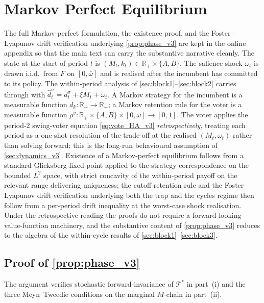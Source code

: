 \documentclass[11pt,twoside]{extarticle}
\begin{document}
\section{Markov Perfect Equilibrium} \label{oa:mpe_v3}

The full Markov-perfect formulation, the existence proof, and the Foster--Lyapunov drift verification underlying \autoref{prop:phase_v3} are kept in the online appendix so that the main text can carry the substantive narrative cleanly. The state at the start of period $t$ is $(M_t,k_t)\in\mathbb R_+\times\{A,B\}$. The salience shock $\omega_t$ is drawn i.i.d.\ from $F$ on $[0,\bar\omega]$ and is realised after the incumbent has committed to its policy. The within-period analysis of \autoref{sec:block1}--\autoref{sec:block2} carries through with $\hat d_t^\sigma=d_t^\sigma+\xi M_t+\omega_t$. A Markov strategy for the incumbent is a measurable function $d_k:\mathbb R_+\to\mathbb R_+$; a Markov retention rule for the voter is a measurable function $\rho^v:\mathbb R_+\times\{A,B\}\times[0,\bar\omega]\to[0,1]$. The voter applies the period-2 swing-voter equation \eqref{eq:vote_HA_v3} \emph{retrospectively}, treating each period as a one-shot resolution of the trade-off at the realised $(M_t,\omega_t)$ rather than solving forward; this is the long-run behavioural assumption of \autoref{sec:dynamics_v3}. Existence of a Markov-perfect equilibrium follows from a standard Glicksberg fixed-point applied to the strategy correspondence on the bounded $L^2$ space, with strict concavity of the within-period payoff on the relevant range delivering uniqueness; the cutoff retention rule and the Foster--Lyapunov drift verification underlying both the trap and the cycles regime then follow from a per-period drift inequality at the worst-case shock realisation. Under the retrospective reading the proofs do not require a forward-looking value-function machinery, and the substantive content of \autoref{prop:phase_v3} reduces to the algebra of the within-cycle results of \autoref{sec:block1}--\autoref{sec:block3}.

\subsection*{Proof of \autoref{prop:phase_v3}} \label{oa:proof_phase_v3}

The argument verifies stochastic forward-invariance of $\mathcal T^*$ in part~(i) and the three Meyn--Tweedie conditions on the marginal $M$-chain in part~(ii).
\end{document}
